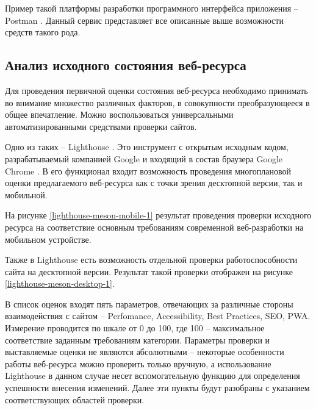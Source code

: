 Пример такой платформы разработки программного интерфейса приложения -- Postman \cite{postman}.
Данный сервис представляет все описанные выше возможности средств такого рода.

\subsection{Анализ исходного состояния веб-ресурса}

Для проведения первичной оценки состояния веб-ресурса необходимо принимать во внимание множество различных факторов, в совокупности преобразующееся в общее впечатление.
Можно воспользоваться универсальными автоматизированными средствами проверки сайтов.

Одно из таких -- Lighthouse \cite{lighthouse}.
Это инструмент с открытым исходным кодом, разрабатываемый компанией Google \cite{google} и входящий в состав браузера Google Chrome \cite{chrome}.
В его функционал входит возможность проведения многоплановой оценки предлагаемого веб-ресурса как с точки зрения десктопной версии, так и мобильной.

На рисунке \ref{lighthouse-meson-mobile-1} результат проведения проверки исходного ресурса на соответствие основным требованиям современной веб-разработки на мобильном устройстве.


Также в Lighthouse есть возможность отдельной проверки работоспособности сайта на десктопной версии.
Результат такой проверки отображен на рисунке \ref{lighthouse-meson-desktop-1}.


В список оценок входят пять параметров, отвечающих за различные стороны взаимодействия с сайтом -- Perfomance, Accessibility, Best Practices, SEO, PWA.
Измерение проводится по шкале от 0 до 100, где 100 -- максимальное соответствие заданным требованиям категории.
Параметры проверки и выставляемые оценки не являются абсолютными -- некоторые особенности работы веб-ресурса можно проверить только вручную, а использование Lighthouse в данном случае несет вспомогательную функцию для определения успешности внесения изменений.
Далее эти пункты будут разобраны с указанием соответствующих областей проверки.

